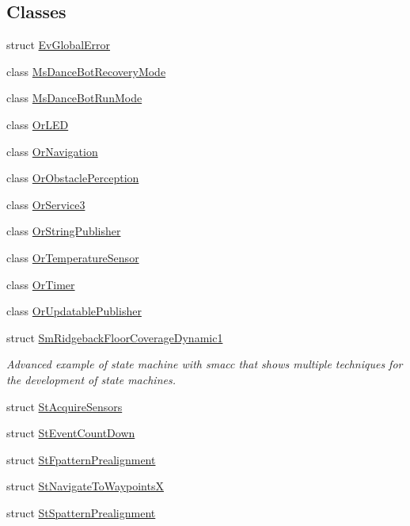 \subsection*{Classes}
\begin{DoxyCompactItemize}
\item 
struct \hyperlink{structsm__ridgeback__floor__coverage__dynamic__1_1_1EvGlobalError}{Ev\+Global\+Error}
\item 
class \hyperlink{classsm__ridgeback__floor__coverage__dynamic__1_1_1MsDanceBotRecoveryMode}{Ms\+Dance\+Bot\+Recovery\+Mode}
\item 
class \hyperlink{classsm__ridgeback__floor__coverage__dynamic__1_1_1MsDanceBotRunMode}{Ms\+Dance\+Bot\+Run\+Mode}
\item 
class \hyperlink{classsm__ridgeback__floor__coverage__dynamic__1_1_1OrLED}{Or\+L\+ED}
\item 
class \hyperlink{classsm__ridgeback__floor__coverage__dynamic__1_1_1OrNavigation}{Or\+Navigation}
\item 
class \hyperlink{classsm__ridgeback__floor__coverage__dynamic__1_1_1OrObstaclePerception}{Or\+Obstacle\+Perception}
\item 
class \hyperlink{classsm__ridgeback__floor__coverage__dynamic__1_1_1OrService3}{Or\+Service3}
\item 
class \hyperlink{classsm__ridgeback__floor__coverage__dynamic__1_1_1OrStringPublisher}{Or\+String\+Publisher}
\item 
class \hyperlink{classsm__ridgeback__floor__coverage__dynamic__1_1_1OrTemperatureSensor}{Or\+Temperature\+Sensor}
\item 
class \hyperlink{classsm__ridgeback__floor__coverage__dynamic__1_1_1OrTimer}{Or\+Timer}
\item 
class \hyperlink{classsm__ridgeback__floor__coverage__dynamic__1_1_1OrUpdatablePublisher}{Or\+Updatable\+Publisher}
\item 
struct \hyperlink{structsm__ridgeback__floor__coverage__dynamic__1_1_1SmRidgebackFloorCoverageDynamic1}{Sm\+Ridgeback\+Floor\+Coverage\+Dynamic1}
\begin{DoxyCompactList}\small\item\em Advanced example of state machine with smacc that shows multiple techniques for the development of state machines. \end{DoxyCompactList}\item 
struct \hyperlink{structsm__ridgeback__floor__coverage__dynamic__1_1_1StAcquireSensors}{St\+Acquire\+Sensors}
\item 
struct \hyperlink{structsm__ridgeback__floor__coverage__dynamic__1_1_1StEventCountDown}{St\+Event\+Count\+Down}
\item 
struct \hyperlink{structsm__ridgeback__floor__coverage__dynamic__1_1_1StFpatternPrealignment}{St\+Fpattern\+Prealignment}
\item 
struct \hyperlink{structsm__ridgeback__floor__coverage__dynamic__1_1_1StNavigateToWaypointsX}{St\+Navigate\+To\+WaypointsX}
\item 
struct \hyperlink{structsm__ridgeback__floor__coverage__dynamic__1_1_1StSpatternPrealignment}{St\+Spattern\+Prealignment}
\end{DoxyCompactItemize}
